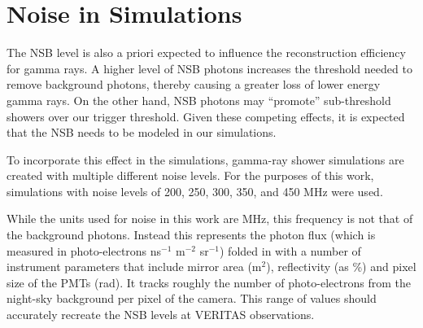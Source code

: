\documentclass[main.tex]{subfiles}
\begin{document}
\section{Noise in Simulations}
The NSB level is also a priori expected to influence the reconstruction efficiency for gamma rays. A higher level of NSB photons increases the threshold needed to remove background photons, thereby causing a greater loss of lower energy gamma rays. On the other hand, NSB photons may ``promote'' sub-threshold showers over our trigger threshold. Given these competing effects, it is expected that the NSB needs to be modeled in our simulations.

To incorporate this effect in the simulations, gamma-ray shower simulations are created with multiple different noise levels. For the purposes of this work, simulations with noise levels of 200, 250, 300, 350, and 450 MHz were used.

While the units used for noise in this work are MHz, this frequency is not that of the background photons. Instead this represents the photon flux (which is measured in photo-electrons ns$^{-1}$ m$^{-2}$ sr$^{-1}$) folded in with a number of instrument parameters that include mirror area (m$^2$), reflectivity (as \%) and pixel size of the PMTs (rad). It tracks roughly the number of photo-electrons from the night-sky background per pixel of the camera. This range of values should accurately recreate the NSB levels at VERITAS observations.
\end{document}
